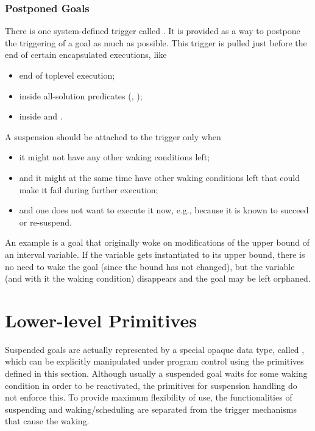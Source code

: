 {\subsubsection{Postponed Goals}
There is one system-defined trigger called .%
It is provided as a way to postpone the triggering of a goal as much
as possible. This trigger is pulled just before the end of
certain encapsulated executions, like
\begin{itemize}
\item end of toplevel execution;
\item inside all-solution predicates
  (,
  );
\item inside  and
  .
\end{itemize}
A suspension should be attached to the  trigger only when
\begin{itemize}
\item it might not have any other waking conditions left;
\item and it might at the same time have other waking conditions left
        that could make it fail during further execution;
\item and one does not want to execute it now, e.g., because it is known
        to succeed or re-suspend.
\end{itemize}
An example is a goal that originally woke on modifications of the upper
bound of an interval variable. If the variable gets instantiated to its
upper bound, there is no need to wake the goal (since the bound has not
changed), but the variable (and with it the waking condition) disappears
and the goal may be left orphaned.




\section{Lower-level Primitives}

Suspended goals are actually represented by a special
opaque data type, called , which can be explicitly
manipulated under program control using the primitives defined in
this section.
Although usually a suspended goal waits for some waking condition
in order to be reactivated, the primitives for suspension handling
do not enforce this. To provide maximum flexibility of use,
the functionalities of suspending and waking/scheduling are
separated from the trigger mechanisms that cause the waking.


}
